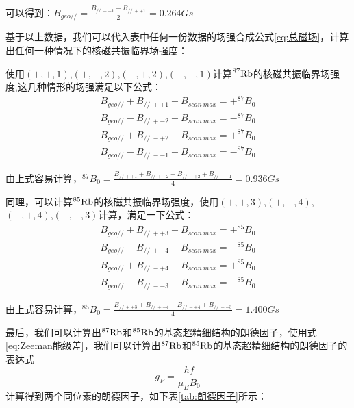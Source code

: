 \documentclass[10pt,hyperref,a4paper,UTF8]{ctexart}
\newcommand{\pll}{/\!/}
\begin{document}
                可以得到：$B_{geo\pll}=\frac{B_{\pll\ --1}-B_{\pll\ ++1}}{2}=0.264 \unit{Gs}$

                基于以上数据，我们可以代入表中任何一份数据的场强合成公式\ref{eq:总磁场}，计算出任何一种情况下的核磁共振临界场强度：

                使用$(+,+,1)$,$(+,-,2)$,$(-,+,2)$,$(-,-,1)$计算$^{87}\rm{Rb}$的核磁共振临界场强度,这几种情形的场强满足以下公式：
                \begin{align}
                        B_{geo\pll} + B_{\pll\ ++1} + B_{scan\ max} = + ^{87}B_0\\
                        B_{geo\pll} - B_{\pll\ +-2} + B_{scan\ max} = - ^{87}B_0\\
                        B_{geo\pll} + B_{\pll\ -+2} - B_{scan\ max} = + ^{87}B_0\\
                        B_{geo\pll} - B_{\pll\ --1} - B_{scan\ max} = - ^{87}B_0
                \end{align}

                由上式容易计算，$^{87}B_0 = \frac{B_{\pll\ ++1}+B_{\pll\ +-2}+B_{\pll\ -+2}+B_{\pll\ --1}}{4} = 0.936 \unit{Gs}$

                同理，可以计算$^{85}\rm{Rb}$的核磁共振临界场强度，使用$(+,+,3)$,$(+,-,4)$,$(-,+,4)$,$(-,-,3)$计算，满足一下公式：
                \begin{align}
                        B_{geo\pll} + B_{\pll\ ++3} + B_{scan\ max} = + ^{85}B_0\\
                        B_{geo\pll} - B_{\pll\ +-4} + B_{scan\ max} = - ^{85}B_0\\
                        B_{geo\pll} + B_{\pll\ -+4} - B_{scan\ max} = + ^{85}B_0\\
                        B_{geo\pll} - B_{\pll\ --3} - B_{scan\ max} = - ^{85}B_0
                \end{align}

                由上式容易计算，$^{85}B_0 = \frac{B_{\pll\ ++3}+B_{\pll\ +-4}+B_{\pll\ -+4}+B_{\pll\ --3}}{4} = 1.400 \unit{Gs}$

                最后，我们可以计算出$^{87}\rm{Rb}$和$^{85}\rm{Rb}$的基态超精细结构的朗德因子，使用式\ref{eq:Zeeman能级差}，我们可以计算出$^{87}\rm{Rb}$和$^{85}\rm{Rb}$的基态超精细结构的朗德因子的表达式
                \begin{equation}
                        g_F = \frac{hf}{\mu_B B_0}
                \end{equation}
                计算得到两个同位素的朗德因子，如下表\ref{tab:朗德因子}所示：
\end{document}
